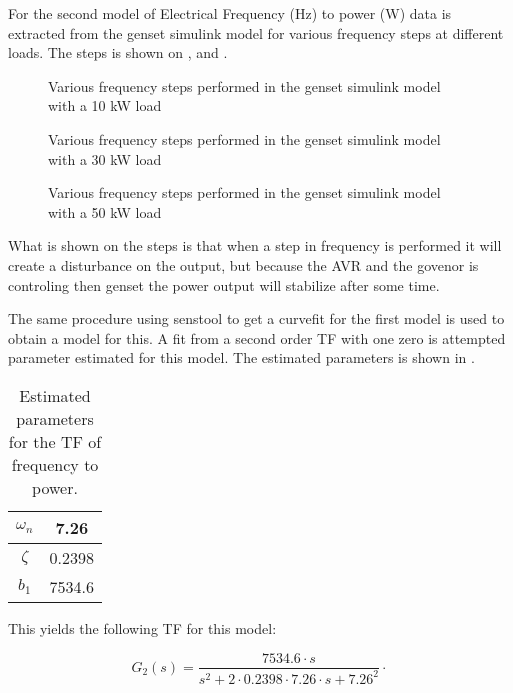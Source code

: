 For the second model of Electrical Frequency (Hz) to power (W) data is extracted from the genset simulink model for various frequency steps at different loads.
The steps is shown on ,  and .

\begin{figure}[H]
\centering

\caption{Various frequency steps performed in the genset simulink model with a 10 kW load}
\label{fig:freqsteps10kw}
\end{figure}

\begin{figure}[H]
\centering

\caption{Various frequency steps performed in the genset simulink model with a 30 kW load}
\label{fig:freqsteps30kw}
\end{figure}

\begin{figure}[H]
\centering

\caption{Various frequency steps performed in the genset simulink model with a 50 kW load}
\label{fig:freqsteps50kw}
\end{figure}

What is shown on the steps is that when a step in frequency is performed it will create a disturbance on the output, but because the AVR and the govenor is controling then genset the power output will stabilize after some time.

The same procedure using senstool to get a curvefit for the first model is used to obtain a model for this. A fit from a second order TF with one zero is attempted parameter estimated for this model. The estimated parameters is shown in .

\begin{table}[H]
\centering
\begin{tabular}{|c|c|}
\hline
$\omega_n$ & 7.26 \\ \hline
$\zeta$  & 0.2398 \\ \hline
$b_1$       & 7534.6    \\ \hline
\end{tabular}
\caption{Estimated parameters for the TF of frequency to power.}
\label{tab:freqpowerparam}
\end{table}  

This yields the following TF for this model:

\begin{equation}
\label{eq:tf2_one_zeros}
G_2(s) = \frac {7534.6 \cdot s}{s^2+2\cdot 0.2398 \cdot 7.26 \cdot s + 7.26^2} \unit{\cdot}
\end{equation} 

